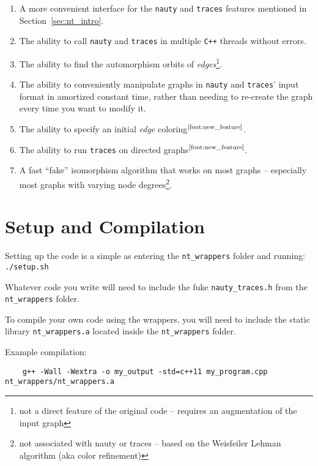\documentclass{article}
\begin{document}
\begin{enumerate}
    \item A more convenient interface for the \verb|nauty| and \verb|traces| features mentioned in Section~\ref{sec:nt_intro}.
    \item The ability to call \verb|nauty| and \verb|traces| in multiple \verb|C++| threads without errors.
    \item The ability to find the automorphism orbits of \emph{edges}\footnote{not a direct feature of the original code -- requires an augmentation of the input graph\label{foot:new_feature}}.
    \item The ability to conveniently manipulate graphs in \verb|nauty| and \verb|traces|' input format in amortized constant time, rather than needing to re-create the graph every time you want to modify it.
    \item The ability to specify an initial \emph{edge} coloring$^\text{\ref{foot:new_feature}}$.
    \item The ability to run \verb|traces| on directed graphs$^\text{\ref{foot:new_feature}}$.
    \item A fast ``fake'' isomorphism algorithm that works on most graphs -- especially most graphs with varying node degrees\footnote{not associated with nauty or traces -- based on the Weisfeiler Lehman algorithm (aka color refinement)}.
\end{enumerate}

\newpage

\section{Setup and Compilation}\label{sec:setup}

Setting up the code is a simple as entering the \verb|nt_wrappers| folder and running: \verb|./setup.sh|

Whatever code you write will need to include the fuke \verb|nauty_traces.h| from the \verb|nt_wrappers| folder.

To compile your own code using the wrappers, you will need to include the static library \verb|nt_wrappers.a| located inside the \verb|nt_wrappers| folder.

Example compilation:

\begin{verbatim}
    g++ -Wall -Wextra -o my_output -std=c++11 my_program.cpp nt_wrappers/nt_wrappers.a
\end{verbatim}
\end{document}
